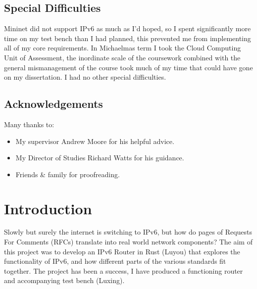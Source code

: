 \documentclass[12pt,a4paper,twoside,openright]{report}
\begin{document}
\section*{Special Difficulties}

Mininet did not support IPv6 as much as I'd hoped, so I spent significantly more time on my test bench than I had planned, this prevented me from implementing all of my core requirements.  In Michaelmas term I took the Cloud Computing Unit of Assessment, the inordinate scale of the coursework combined with the general mismanagement of the course took much of my time that could have gone on my dissertation.  I had no other special difficulties.

\tableofcontents
{}
\listoffigures
{}

\newpage
\section*{Acknowledgements}

Many thanks to:
\begin{itemize}
\item My supervisor Andrew Moore for his helpful advice.
\item My Director of Studies Richard Watts for his guidance.
\item Friends \& family for proofreading.
\end{itemize}


\pagestyle{headings}

\chapter{Introduction}
\label{chap::introduction}
Slowly but surely the internet is switching to IPv6\cite{ipv6_rfc}, but how do pages of Requests For Comments (RFCs) translate into real world network components? The aim of this project was to develop an IPv6 Router in Rust (Luyou) that explores the functionality of IPv6, and how different parts of the various standards fit together. The project has been a success, I have produced a functioning router and accompanying test bench (Luxing).

\bigskip
\end{document}
